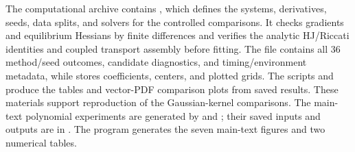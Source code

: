 \documentclass[11pt]{article}
\theoremstyle{plain}      %
\theoremstyle{definition} %
\providecommand{\DIFaddtex}[1]{{\protect\color{blue}#1}} %
\providecommand{\DIFaddbegin}{} %
\providecommand{\DIFaddend}{} %
\providecommand{\DIFdelbegin}{} %
\providecommand{\DIFdelend}{} %
\providecommand{\DIFadd}[1]{\texorpdfstring{\DIFaddtex{#1}}{#1}} %
\newcommand{\DIFscaledelfig}{1.0}
\newlength{\DIFdelgraphicswidth} %
\newlength{\DIFdelgraphicsheight} %
\newcommand{\DIFaddincludegraphics}[2][]{{\color{blue}\fbox{\DIFOincludegraphics[#1]{#2}}}} %
\newcommand{\DIFdelincludegraphics}[2][]{%
\sbox{\DIFdelgraphicsbox}{\DIFOincludegraphics[#1]{#2}}%
\settoboxwidth{\DIFdelgraphicswidth}{\DIFdelgraphicsbox} %
\settoboxtotalheight{\DIFdelgraphicsheight}{\DIFdelgraphicsbox} %
\scalebox{\DIFscaledelfig}{%
\parbox[b]{\DIFdelgraphicswidth}{\usebox{\DIFdelgraphicsbox}\\[-\baselineskip] \rule{\DIFdelgraphicswidth}{0em}}\llap{\resizebox{\DIFdelgraphicswidth}{\DIFdelgraphicsheight}{%
\setlength{\unitlength}{\DIFdelgraphicswidth}%
\begin{picture}(1,1)%
\thicklines\linethickness{2pt} %
{\color[rgb]{1,0,0}\put(0,0){\framebox(1,1){}}}%
{\color[rgb]{1,0,0}\put(0,0){\line( 1,1){1}}}%
{\color[rgb]{1,0,0}\put(0,1){\line(1,-1){1}}}%
\end{picture}%
}\hspace*{3pt}}} %
} %
\DeclareRobustCommand{\DIFaddbegin}{\DIFOaddbegin \let\includegraphics\DIFaddincludegraphics} %
\DeclareRobustCommand{\DIFaddend}{\DIFOaddend \let\includegraphics\DIFOincludegraphics} %
\DeclareRobustCommand{\DIFdelbegin}{\DIFOdelbegin \let\includegraphics\DIFdelincludegraphics} %
\DeclareRobustCommand{\DIFdelend}{\DIFOaddend \let\includegraphics\DIFOincludegraphics} %
\begin{document}
\DIFadd{The computational archive contains }{\color{blue}}\DIFadd{, which defines the systems, derivatives, seeds, data splits, and solvers for the controlled comparisons. It checks gradients and equilibrium Hessians by finite differences and verifies the analytic HJ/Riccati identities and coupled transport assembly before fitting. The file }{\color{blue}} \DIFadd{contains all 36 method/seed outcomes, candidate diagnostics, and timing/environment metadata, while }{\color{blue}} \DIFadd{stores coefficients, centers, and plotted grids. The scripts }{\color{blue}} \DIFadd{and }{\color{blue}} \DIFadd{produce the tables and vector-PDF comparison plots from saved results. These materials support reproduction of the Gaussian-kernel comparisons. The main-text polynomial experiments are generated by } \DIFadd{and }\DIFadd{; their saved inputs and outputs are in }\DIFadd{. The program } \DIFadd{generates the seven main-text figures and two numerical tables.
}

\FloatBarrier

\DIFaddend 
\DIFdelbegin %
\DIFdelend \DIFaddbegin 
\DIFaddend 
\end{document}
